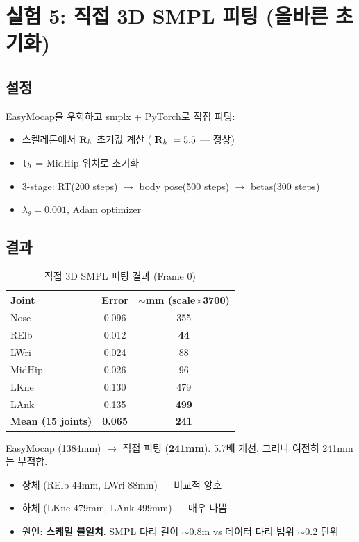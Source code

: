 \documentclass[11pt, a4paper]{report}
\begin{document}
\chapter{실험 5: 직접 3D SMPL 피팅 (올바른 초기화)}

\section{설정}
EasyMocap을 우회하고 smplx + PyTorch로 직접 피팅:
\begin{itemize}[leftmargin=*]
  \item 스켈레톤에서 $\mathbf{R}_h$ 초기값 계산 ($|\mathbf{R}_h| = 5.5$\textdegree{} --- 정상)
  \item $\mathbf{t}_h$ = MidHip 위치로 초기화
  \item 3-stage: RT(200 steps) $\rightarrow$ body pose(500 steps) $\rightarrow$ betas(300 steps)
  \item $\lambda_\theta = 0.001$, Adam optimizer
\end{itemize}

\section{결과}

\begin{table}[H]
\centering
\caption{직접 3D SMPL 피팅 결과 (Frame 0)}
\renewcommand{\arraystretch}{1.3}
\begin{tabular}{l cc}
\toprule
\textbf{Joint} & \textbf{Error} & \textbf{$\sim$mm (scale$\times$3700)} \\
\midrule
Nose & 0.096 & 355 \\
RElb & 0.012 & \textbf{44} \\
LWri & 0.024 & 88 \\
MidHip & 0.026 & 96 \\
LKne & 0.130 & 479 \\
LAnk & 0.135 & \textbf{499} \\
\midrule
\textbf{Mean (15 joints)} & \textbf{0.065} & \textbf{241} \\
\bottomrule
\end{tabular}
\end{table}

\begin{summary}
EasyMocap (1384mm) $\rightarrow$ 직접 피팅 (\textbf{241mm}). 5.7배 개선. 그러나 여전히 241mm는 부적합.
\begin{itemize}[leftmargin=*]
  \item 상체 (RElb 44mm, LWri 88mm) --- 비교적 양호
  \item 하체 (LKne 479mm, LAnk 499mm) --- 매우 나쁨
  \item 원인: \textbf{스케일 불일치}. SMPL 다리 길이 $\sim$0.8m vs 데이터 다리 범위 $\sim$0.2 단위
\end{itemize}
\end{summary}
\end{document}
